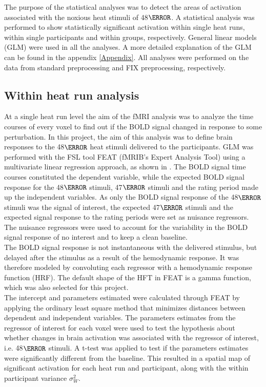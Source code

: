 The purpose of the statistical analyses was to detect the areas of activation associated with the noxious heat stimuli of 48$\degree$. A statistical analysis was performed to show statistically significant activation within single heat runs, within single participants and within groups, respectively. General linear models (GLM) were used in all the analyses. A more detailed explanation of the GLM can be found in the appendix \ref{Appendix}. All analyses were performed on the data from standard preprocessing and FIX preprocessing, respectively.

\subsection{Within heat run analysis}
At a single heat run level the aim of the fMRI analysis was to analyze the time courses of every voxel to find out if the BOLD signal changed in response to some perturbation. In this project, the aim of this analysis was to define brain responses to the 48$\degree$ heat stimuli delivered to the participants. GLM was performed with the FSL tool FEAT (fMRIB’s Expert Analysis Tool) using a multivariate linear regression approach, as shown in . The BOLD signal time courses constituted the dependent variable, while the expected BOLD signal response for the 48$\degree$ stimuli, 47$\degree$ stimuli and the rating period made up the independent variables. As only the BOLD signal response of the 48$\degree$ stimuli was the signal of interest, the expected 47$\degree$ stimuli and the expected signal response to the rating periods were set as nuisance regressors. The nuisance regressors were used to account for the variability in the BOLD signal response of no interest and to keep a clean baseline. \\
The BOLD signal response is not instantaneous with the delivered stimulus, but delayed after the stimulus as a result of the hemodynamic response. It was therefore modeled by convoluting each regressor with a hemodynamic response function (HRF). The default shape of the HFT in FEAT is a  gamma function, which was also selected for this project. \\
The intercept and parameters estimated were calculated through FEAT by applying the ordinary least square method that minimizes distances between dependent and independent variables. The parameters estimates from the regressor of interest for each voxel were used to test the hypothesis about whether changes in brain activation was associated with the regressor of interest, i.e. 48$\degree$ stimuli. A t-test was applied to test if the parameters estimates were significantly different from the baseline. This resulted in a spatial map of significant activation for each heat run and participant, along with the within participant variance $\sigma_{W}^{2}$. \\
